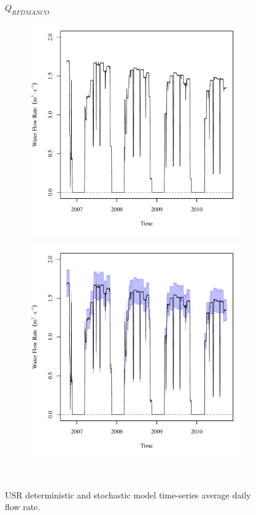 \subfiguremid
\begin{landscape}
	\begin{figure}
		\centering
		$ Q_{RFDMANCO} $
		\begin{subfigure}{0.7\textwidth}
			\centering
			\includegraphics[width=\tableCustomSize]{"Figures/Results_USR/Deterministic/Q RFD"}
		\end{subfigure}%
		\begin{subfigure}{0.7\textwidth}
			\centering
			\includegraphics[width=\tableCustomSize]{"Figures/Results_USR/Stochastic/Q RFD"}
		\end{subfigure}\\
		\caption{USR deterministic and stochastic model time-series average daily flow rate.}
	\end{figure}
\end{landscape}
